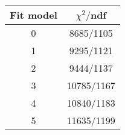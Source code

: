 \begin{tabular}{c|c}
Fit model & $\chi^2/$ndf \\
\hline
0 & 8685/1105\\
1 & 9295/1121\\
2 & 9444/1137\\
3 & 10785/1167\\
4 & 10840/1183\\
5 & 11635/1199\\
\end{tabular}
